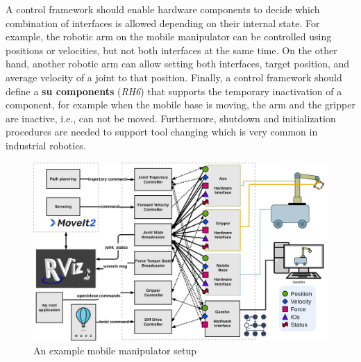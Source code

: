 \documentclass[journal]{IEEEtran}
\begin{document}
A control framework should enable hardware components to decide which combination of interfaces is allowed depending on their internal state.
For example, the robotic arm on the mobile manipulator can be controlled using positions or velocities, but not both interfaces at the same time.
On the other hand, another robotic arm can allow setting both interfaces, target position, and average velocity of a joint to that position.
Finally, a control framework should define a \textbf{su components} (\emph{RH6}) that supports the temporary inactivation of a component, for example when the mobile base is moving, the arm and the gripper are inactive, i.e., can not be moved.
Furthermore, shutdown and initialization procedures are needed to support tool changing which is very common in industrial robotics.

\begin{figure}
    \centering
    \includegraphics[width=\columnwidth]{figures/ros2_control_mobile_manipulator_control_arch_independent_hardware}
    \caption{An example mobile manipulator setup}
    \label{fig:ros2c-mobile-manipulator-control-architecture}
\end{figure}
\end{document}

